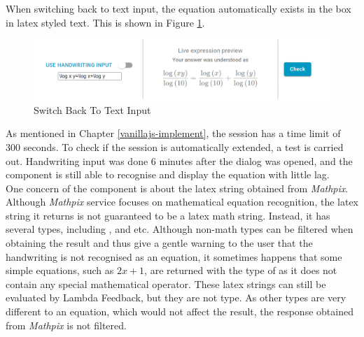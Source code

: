 \documentclass[12pt,twoside]{report}
\begin{document}
When switching back to text input, the equation automatically exists in the box in latex styled text. This is shown in Figure \ref{fig:test-switch-back}.
\begin{figure}
    \centering
    \includegraphics[width=\linewidth, frame]{figures/test-switch-back.png}
    \caption{Switch Back To Text Input}
    \label{fig:test-switch-back}
\end{figure}

As mentioned in Chapter \ref{vanillajs-implement}, the session has a time limit
of 300 seconds. To check if the session is automatically extended, a test is
carried out. Handwriting input was done 6 minutes after the dialog was opened,
and the component is still able to recognise and display the equation with
little lag.
\\

One concern of the component is about the latex string obtained from
\textit{Mathpix}. Although \textit{Mathpix} service focuses on mathematical
equation recognition, the latex string it returns is not guaranteed to be a
latex math string. Instead, it has several types, including ,
 and  etc. Although non-math types can be filtered when
obtaining the result and thus give a gentle warning to the user that the
handwriting is not recognised as an equation, it sometimes happens that some simple equations, such as $2x+1$, are returned with the type of  as it does not contain any special mathematical operator. These latex strings can still be evaluated by Lambda Feedback, but they are not  type. As other types are very different to an equation, which would not affect the result, the response obtained from \textit{Mathpix} is not filtered.
\end{document}
